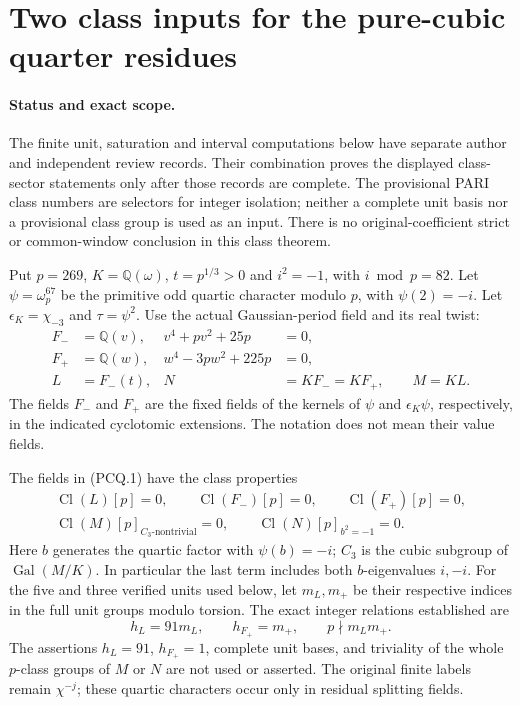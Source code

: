 \section{Two class inputs for the pure-cubic quarter residues}
\label{sec:pure-cubic-quartic-class}

\paragraph{Status and exact scope.}
The finite unit, saturation and interval computations below have
separate author and independent review records.  Their combination
proves the displayed class-sector statements only after those records
are complete.  The provisional PARI class numbers are selectors for
integer isolation; neither a complete unit basis nor a provisional
class group is used as an input.  There is no original-coefficient
strict or common-window conclusion in this class theorem.

Put $p=269$, $K=\mathbb Q(\omega)$, $t=p^{1/3}>0$ and
$i^2=-1$, with $i\bmod p=82$.
Let $\psi=\omega_p^{67}$ be the primitive odd quartic character
modulo $p$, with $\psi(2)=-i$.
Let $\epsilon_K=\chi_{-3}$ and $\tau=\psi^2$.
Use the actual Gaussian-period field and its real twist:
\[
 \begin{aligned}
 F_-&=\mathbb Q(v),&v^4+pv^2+25p&=0,\\
 F_+&=\mathbb Q(w),&w^4-3pw^2+225p&=0,\\
 L&=F_-(t),&N&=KF_-=KF_+,\qquad M=KL.
 \end{aligned}
 \tag{PCQ.1}
\]
The fields $F_-$ and $F_+$ are the fixed fields of the kernels of
$\psi$ and $\epsilon_K\psi$, respectively, in the indicated
cyclotomic extensions.  The notation does not mean their value fields.

\begin{theorem}
\label{AC-G156-class}
The fields in (PCQ.1) have the class properties
\[
 \begin{gathered}
 \operatorname{Cl}(L)[p]=0,\qquad
 \operatorname{Cl}(F_-)[p]=0,\qquad
 \operatorname{Cl}(F_+)[p]=0,\\
 \operatorname{Cl}(M)[p]_{C_3\text{-nontrivial}}=0,\qquad
 \operatorname{Cl}(N)[p]_{b^2=-1}=0.
 \end{gathered}
 \tag{PCQ.2}
\]
Here $b$ generates the quartic factor with $\psi(b)=-i$;
$C_3$ is the cubic subgroup of $\operatorname{Gal}(M/K)$.
In particular the last term includes both $b$-eigenvalues $i,-i$.
For the five and three verified units used below, let $m_L,m_+$
be their respective indices in the full unit groups modulo torsion.
The exact integer relations established are
\[
             h_L=91m_L,\qquad h_{F_+}=m_+,
                     \qquad p\nmid m_Lm_+.
 \tag{PCQ.3}
\]
The assertions $h_L=91$, $h_{F_+}=1$, complete unit bases, and
triviality of the whole $p$-class groups of $M$ or $N$ are not used
or asserted.  The original finite labels remain $\chi^{-j}$;
these quartic characters occur only in residual splitting fields.
\end{theorem}

